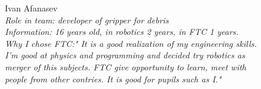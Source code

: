\begin{figure}[H]	
	\begin{minipage}{0.47\linewidth}
	\end{minipage}
	\hfill
	\begin{minipage}{0.47\linewidth}
		Ivan Afanasev\\
		\emph{Role in team: developer of gripper for debris\\ }
		\emph{Information: 16 years old, in robotics 2 years, in FTC 1 years. \\ } 
		\emph{Why I chose FTC:" It is a good realization of my engineering skills. I'm good at physics and programming and decided try robotics as merger of this subjects. FTC give opportunity to learn, meet with people from other contries. It is good for pupils such as I."}		
	\end{minipage}
\end{figure}
\hfill
